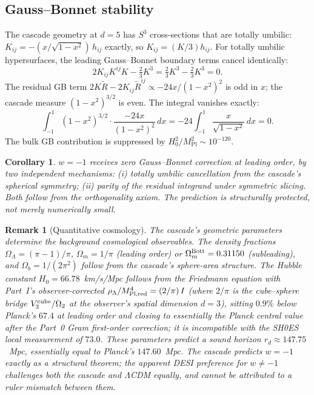 \documentclass[12pt,a4paper]{article}
\newtheorem{corollary}[theorem]{Corollary}
\newtheorem*{remark}{Remark}
\begin{document}
\subsection{Gauss--Bonnet stability}

The cascade geometry at $d = 5$ has $S^3$ cross-sections that are totally umbilic: $K_{ij} =
-(x/\sqrt{1 - x^2})\,h_{ij}$ exactly, so $K_{ij} = (K/3)h_{ij}$. For totally umbilic hypersurfaces, the leading
Gauss--Bonnet boundary terms cancel identically:
\[
2K_{ij}K^{ij}K - \tfrac{2}{3}K^3 = \tfrac{2}{3}K^3 - \tfrac{2}{3}K^3 = 0.
\]
The residual GB term $2K\tilde{R} - 2K_{ij}\tilde{R}^{ij} \propto -24x/(1 - x^2)^2$ is odd in $x$; the cascade measure
$(1 - x^2)^{3/2}$ is even. The integral vanishes exactly:
\[
\int_{-1}^{1} (1 - x^2)^{3/2} \cdot \frac{-24x}{(1 - x^2)^2}\,dx = -24\int_{-1}^{1} \frac{x}{\sqrt{1 - x^2}}\,dx = 0.
\]
The bulk GB contribution is suppressed by $H_0^2/M_{\text{Pl}}^2 \sim 10^{-120}$.

\begin{corollary}
$w = -1$ receives zero Gauss--Bonnet correction at leading order, by two
independent mechanisms: (i) totally umbilic cancellation from the cascade's spherical
symmetry; (ii) parity of the residual integrand under symmetric slicing. Both follow from
the orthogonality axiom. The prediction is structurally protected, not merely numerically
small.
\end{corollary}

\begin{remark}[Quantitative cosmology]
The cascade's geometric parameters determine the background cosmological
observables. The density fractions $\Omega_\Lambda = (\pi-1)/\pi$,
$\Omega_m = 1/\pi$ (leading order) or $\Omega_m^{\rm Bott} = 0.31150$
(subleading), and $\Omega_b = 1/(2\pi^2)$ follow from the cascade's
sphere-area structure. The Hubble constant $H_0 = 66.78$~km/s/Mpc
follows from the Friedmann equation with Part~I's observer-corrected
$\rho_\Lambda/M_{\rm Pl,red}^4 = (2/\pi)\,I$ (where $2/\pi$ is the
cube--sphere bridge $V_3^{\rm cube}/\Omega_2$ at the observer's spatial
dimension $d=3$), sitting $0.9\%$ below Planck's $67.4$ at leading
order and closing to essentially the Planck central value after the
Part~0 Gram first-order correction; it is incompatible with
the SH0ES local measurement of $73.0$. These parameters predict a sound
horizon $r_d \approx 147.75$~Mpc, essentially equal to Planck's
$147.60$~Mpc. The cascade predicts $w = -1$ exactly as a structural
theorem; the apparent DESI preference for $w \neq -1$ challenges both
the cascade and $\Lambda$CDM equally, and cannot be attributed to a
ruler mismatch between them.
\end{remark}
\end{document}
